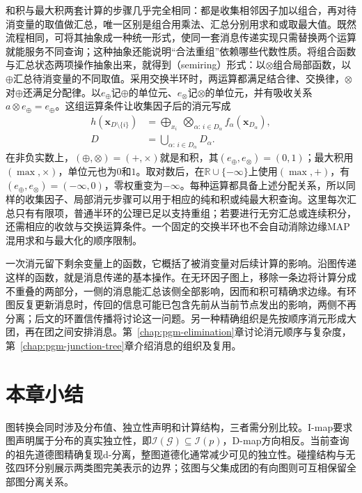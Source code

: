 和积与最大积两套计算的步骤几乎完全相同：都是收集相邻因子加以组合，再对待消变量的取值做汇总，唯一区别是组合用乘法、汇总分别用求和或取最大值。既然流程相同，可将其抽象成一种统一形式，使同一套消息传递实现只需替换两个运算就能服务不同查询；这种抽象还能说明“合法重组”依赖哪些代数性质。将组合函数与汇总状态两项操作抽象出来，就得到（semiring）形式：以$\otimes$组合局部函数，以$\oplus$汇总待消变量的不同取值。采用交换半环时，两运算都满足结合律、交换律，$\otimes$对$\oplus$还满足分配律。以$e_\oplus$记$\oplus$的单位元、$e_\otimes$记$\otimes$的单位元，并有吸收关系$a\otimes e_\oplus=e_\oplus$。这组运算条件让收集因子后的消元写成
\begin{equation}
  \begin{aligned}
    h(\bm{x}_{D\setminus\{i\}})
    &=
    \bigoplus_{x_i}
    \ \bigotimes_{\alpha:\,i\in D_\alpha}
    f_\alpha(\bm{x}_{D_\alpha}),\\
    D&=\bigcup_{\alpha:\,i\in D_\alpha}D_\alpha.
  \end{aligned}
  \label{eq:pgm-representations-semiring-elimination}
\end{equation}
在非负实数上，$(\oplus,\otimes)=(+,\times)$就是和积，其$(e_\oplus,e_\otimes)=(0,1)$；最大积用$(\max,\times)$，单位元也为$0$和$1$。取对数后，在$\mathbb{R}\cup\{-\infty\}$上使用$(\max,+)$，有$(e_\oplus,e_\otimes)=(-\infty,0)$，零权重变为$-\infty$。每种运算都具备上述分配关系，所以同样的收集因子、局部消元步骤可以用于相应的纯和积或纯最大积查询。这里每次汇总只有有限项，普通半环的公理已足以支持重组；若要进行无穷汇总或连续积分，还需相应的收敛与交换运算条件。一个固定的交换半环也不会自动消除边缘MAP混用求和与最大化的顺序限制。

一次消元留下剩余变量上的函数，它概括了被消变量对后续计算的影响。沿图传递这样的函数，就是消息传递的基本操作。在无环因子图上，移除一条边将计算分成不重叠的两部分，一侧的消息能汇总该侧全部影响，因而和积可精确求边缘。有环图反复更新消息时，传回的信息可能已包含先前从当前节点发出的影响，两侧不再分离；后文的环置信传播将讨论这一问题。另一种精确组织是先按顺序消元形成大团，再在团之间安排消息。第~\ref{chap:pgm-elimination}章讨论消元顺序与复杂度，第~\ref{chap:pgm-junction-tree}章介绍消息的组织及复用。

\section{本章小结}
\label{sec:pgm-representations-summary}

图转换会同时涉及分布值、独立性声明和计算结构，三者需分别比较。I-map要求图声明属于分布的真实独立性，即$\mathcal{I}(\mathcal{G})\subseteq\mathcal{I}(p)$，D-map方向相反。当前查询的祖先道德图精确复现d-分离，整图道德化通常减少可见的独立性。碰撞结构与无弦四环分别展示两类图完美表示的边界；弦图与父集成团的有向图则可互相保留全部图分离关系。

